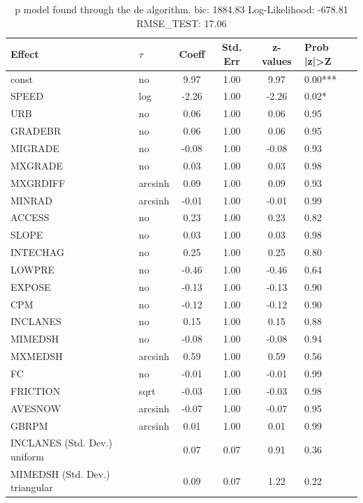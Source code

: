\begin{table}
	\caption{p model found through the de algorithm. bic: 1884.83 Log-Likelihood: -678.81 RMSE_TEST: 17.06}
	\begin{center}
		\begin{tabular}{|l|l|c|c|c|l|}
			\hline
			Effect & $\tau$ & Coeff & Std. Err & z-values & Prob |z|>Z \\
			\hline
			const & no & 9.97 & 1.00 & 9.97 & 0.00*** \\
			\hline
			SPEED & log & -2.26 & 1.00 & -2.26 & 0.02* \\
			\hline
			URB & no & 0.06 & 1.00 & 0.06 & 0.95 \\
			\hline
			GRADEBR & no & 0.06 & 1.00 & 0.06 & 0.95 \\
			\hline
			MIGRADE & no & -0.08 & 1.00 & -0.08 & 0.93 \\
			\hline
			MXGRADE & no & 0.03 & 1.00 & 0.03 & 0.98 \\
			\hline
			MXGRDIFF & arcsinh & 0.09 & 1.00 & 0.09 & 0.93 \\
			\hline
			MINRAD & arcsinh & -0.01 & 1.00 & -0.01 & 0.99 \\
			\hline
			ACCESS & no & 0.23 & 1.00 & 0.23 & 0.82 \\
			\hline
			SLOPE & no & 0.03 & 1.00 & 0.03 & 0.98 \\
			\hline
			INTECHAG & no & 0.25 & 1.00 & 0.25 & 0.80 \\
			\hline
			LOWPRE & no & -0.46 & 1.00 & -0.46 & 0.64 \\
			\hline
			EXPOSE & no & -0.13 & 1.00 & -0.13 & 0.90 \\
			\hline
			CPM & no & -0.12 & 1.00 & -0.12 & 0.90 \\
			\hline
			INCLANES & no & 0.15 & 1.00 & 0.15 & 0.88 \\
			\hline
			MIMEDSH & no & -0.08 & 1.00 & -0.08 & 0.94 \\
			\hline
			MXMEDSH & arcsinh & 0.59 & 1.00 & 0.59 & 0.56 \\
			\hline
			FC & no & -0.01 & 1.00 & -0.01 & 0.99 \\
			\hline
			FRICTION & sqrt & -0.03 & 1.00 & -0.03 & 0.98 \\
			\hline
			AVESNOW & arcsinh & -0.07 & 1.00 & -0.07 & 0.95 \\
			\hline
			GBRPM & arcsinh & 0.01 & 1.00 & 0.01 & 0.99 \\
			\hline
			INCLANES (Std. Dev.) uniform &  & 0.07 & 0.07 & 0.91 & 0.36 \\
			\hline
			MIMEDSH (Std. Dev.) triangular &  & 0.09 & 0.07 & 1.22 & 0.22 \\

\end{tabular}
\end{center}
\end{table}
